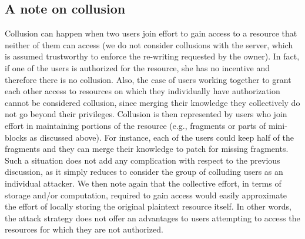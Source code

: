 \subsection{A note on collusion}
Collusion can happen when two users join effort to gain access to a resource that neither of them can access (we do not consider collusions with the server, which is assumed trustworthy to enforce the re-writing requested by the owner). In fact, if one of the users is authorized for the resource, she has no incentive and therefore there is no collusion. Also, the case of users working together to grant each other access to resources on which they individually have authorization cannot be considered collusion, since merging their knowledge they collectively do not go beyond their privileges. Collusion is then represented by users who join effort in maintaining portions of the resource (e.g., fragments or parts of mini-blocks as discussed above). For instance, each of the users could keep half of the fragments and they can merge their knowledge to patch for missing fragments. Such a situation does not add any complication with respect to the previous discussion, as it simply reduces to consider the group of colluding users as an individual attacker. We then note again that the collective effort, in terms of storage and/or computation, required to gain access would easily approximate the effort of locally storing the original plaintext resource itself. In other words, the attack strategy does not offer an advantages to users attempting to access the resources for which they are not authorized.

